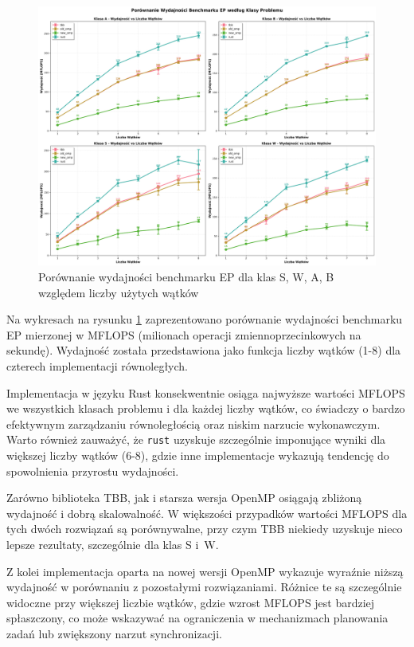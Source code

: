 \begin{figure}[H]
    \centering
    \includegraphics[width=\textwidth]{analiza/images/parallel/ep/arm/ep_porownanie_wydajnosci.png}
    \caption{Porównanie wydajności benchmarku EP dla klas S, W, A, B względem liczby użytych wątków}
    \label{ep_porownanie_wydajnosci}
\end{figure}
Na wykresach na rysunku \ref{ep_porownanie_wydajnosci} zaprezentowano porównanie wydajności benchmarku EP mierzonej w MFLOPS (milionach operacji zmiennoprzecinkowych na sekundę). Wydajność została przedstawiona jako funkcja liczby wątków (1-8) dla czterech implementacji równoległych.

Implementacja w języku Rust konsekwentnie osiąga najwyższe wartości MFLOPS we wszystkich klasach problemu i dla każdej liczby wątków, co świadczy o bardzo efektywnym zarządzaniu równoległością oraz niskim narzucie wykonawczym. Warto również zauważyć, że \texttt{rust} uzyskuje szczególnie imponujące wyniki dla większej liczby wątków (6-8), gdzie inne implementacje wykazują tendencję do spowolnienia przyrostu wydajności.

Zarówno biblioteka TBB, jak i starsza wersja OpenMP osiągają zbliżoną wydajność i dobrą skalowalność. W większości przypadków wartości MFLOPS dla tych dwóch rozwiązań są porównywalne, przy czym TBB niekiedy uzyskuje nieco lepsze rezultaty, szczególnie dla klas S i~W.

Z kolei implementacja oparta na nowej wersji OpenMP wykazuje wyraźnie niższą wydajność w porównaniu z pozostałymi rozwiązaniami. Różnice te są szczególnie widoczne przy większej liczbie wątków, gdzie wzrost MFLOPS jest bardziej spłaszczony, co może wskazywać na ograniczenia w mechanizmach planowania zadań lub zwiększony narzut synchronizacji.


